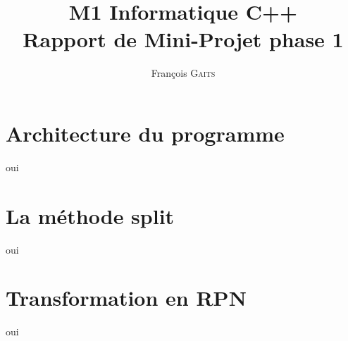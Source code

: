 \documentclass[]{article}
\author{François G\textsc{aits}}
\title{M1 Informatique C++\\Rapport de Mini-Projet phase 1}
\begin{document}
\maketitle

\section{Architecture du programme}
oui

\section{La méthode split}
oui

\section{Transformation en RPN}
oui
\end{document}
